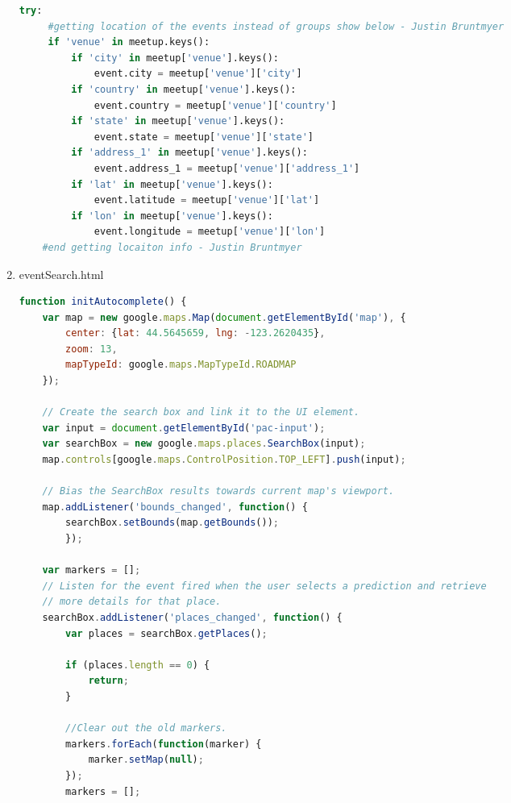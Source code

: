 \documentclass[letterpaper,10pt,onecolumn]{IEEEtran} %
\begin{document}
\begin{enumerate}
\begin{center}
\begin{lstlisting}[language=Python]
 try:
     #getting location of the events instead of groups show below - Justin Bruntmyer
     if 'venue' in meetup.keys():
         if 'city' in meetup['venue'].keys():
             event.city = meetup['venue']['city']
         if 'country' in meetup['venue'].keys():
             event.country = meetup['venue']['country']
         if 'state' in meetup['venue'].keys():
             event.state = meetup['venue']['state']
         if 'address_1' in meetup['venue'].keys():
             event.address_1 = meetup['venue']['address_1']
         if 'lat' in meetup['venue'].keys():
             event.latitude = meetup['venue']['lat']
         if 'lon' in meetup['venue'].keys():
             event.longitude = meetup['venue']['lon']
    #end getting locaiton info - Justin Bruntmyer

\end{lstlisting}
\end{center}

\item eventSearch.html
\begin{center}
\begin{lstlisting}[language=JavaScript]
function initAutocomplete() {
    var map = new google.maps.Map(document.getElementById('map'), {
        center: {lat: 44.5645659, lng: -123.2620435},
        zoom: 13,
        mapTypeId: google.maps.MapTypeId.ROADMAP
    });

    // Create the search box and link it to the UI element.
    var input = document.getElementById('pac-input');
    var searchBox = new google.maps.places.SearchBox(input);
    map.controls[google.maps.ControlPosition.TOP_LEFT].push(input);

    // Bias the SearchBox results towards current map's viewport.
    map.addListener('bounds_changed', function() {
        searchBox.setBounds(map.getBounds());
        });

    var markers = [];
    // Listen for the event fired when the user selects a prediction and retrieve
    // more details for that place.
    searchBox.addListener('places_changed', function() {
        var places = searchBox.getPlaces();

        if (places.length == 0) {
            return;
        }
        
        //Clear out the old markers.
        markers.forEach(function(marker) {
            marker.setMap(null);
        });
        markers = [];


\end{lstlisting}
\end{center}
\end{enumerate}
\end{document}
